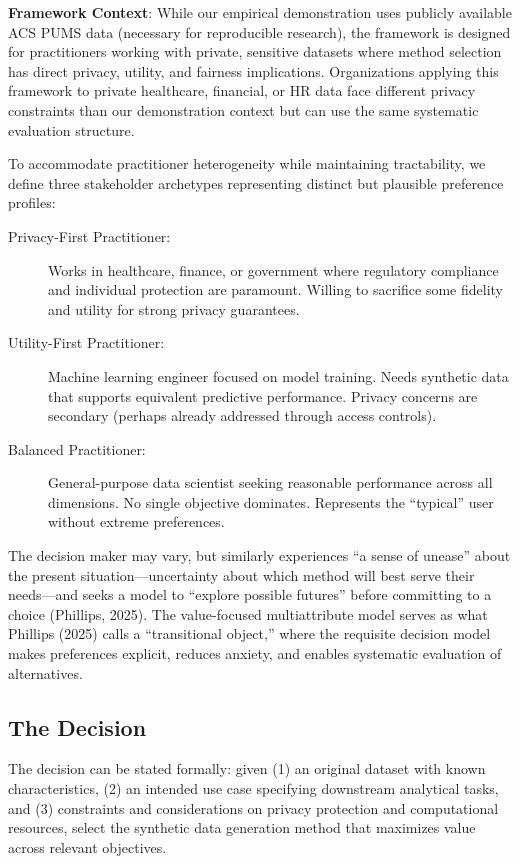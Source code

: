 \documentclass[12pt,a4paper]{article}
\begin{document}
\textbf{Framework Context}: While our empirical demonstration uses publicly available ACS PUMS data (necessary for reproducible research), the framework is designed for practitioners working with private, sensitive datasets where method selection has direct privacy, utility, and fairness implications. Organizations applying this framework to private healthcare, financial, or HR data face different privacy constraints than our demonstration context but can use the same systematic evaluation structure.

To accommodate practitioner heterogeneity while maintaining tractability, we define three stakeholder archetypes representing distinct but plausible preference profiles:

\begin{description}
    \item[Privacy-First Practitioner:] Works in healthcare, finance, or government where regulatory compliance and individual protection are paramount. Willing to sacrifice some fidelity and utility for strong privacy guarantees.
    
    \item[Utility-First Practitioner:] Machine learning engineer focused on model training. Needs synthetic data that supports equivalent predictive performance. Privacy concerns are secondary (perhaps already addressed through access controls).
    
    \item[Balanced Practitioner:] General-purpose data scientist seeking reasonable performance across all dimensions. No single objective dominates. Represents the ``typical'' user without extreme preferences.
\end{description}

The decision maker may vary, but similarly experiences ``a sense of unease'' about the present situation---uncertainty about which method will best serve their needs---and seeks a model to ``explore possible futures'' before committing to a choice (Phillips, 2025). The value-focused multiattribute model serves as what Phillips (2025) calls a ``transitional object,'' where the requisite decision model makes preferences explicit, reduces anxiety, and enables systematic evaluation of alternatives.

\subsection{The Decision}

The decision can be stated formally: given (1) an original dataset with known characteristics, (2) an intended use case specifying downstream analytical tasks, and (3) constraints and considerations on privacy protection and computational resources, select the synthetic data generation method that maximizes value across relevant objectives.
\end{document}
